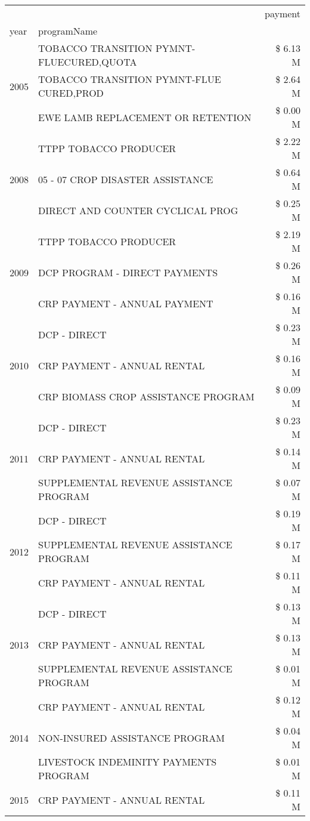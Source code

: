 \begin{tabular}{llr}
\toprule
 &  & payment \\
year & programName &  \\
\midrule
\multirow[t]{3}{*}{2005} & TOBACCO TRANSITION PYMNT-FLUECURED,QUOTA & \$ 6.13 M \\
 & TOBACCO TRANSITION PYMNT-FLUE CURED,PROD & \$ 2.64 M \\
 & EWE LAMB REPLACEMENT OR RETENTION & \$ 0.00 M \\
\cline{1-3}
\multirow[t]{3}{*}{2008} & TTPP TOBACCO PRODUCER & \$ 2.22 M \\
 & 05 - 07 CROP DISASTER ASSISTANCE & \$ 0.64 M \\
 & DIRECT AND COUNTER CYCLICAL PROG & \$ 0.25 M \\
\cline{1-3}
\multirow[t]{3}{*}{2009} & TTPP TOBACCO PRODUCER & \$ 2.19 M \\
 & DCP PROGRAM - DIRECT PAYMENTS & \$ 0.26 M \\
 & CRP PAYMENT - ANNUAL PAYMENT & \$ 0.16 M \\
\cline{1-3}
\multirow[t]{3}{*}{2010} & DCP - DIRECT & \$ 0.23 M \\
 & CRP PAYMENT - ANNUAL RENTAL & \$ 0.16 M \\
 & CRP BIOMASS CROP ASSISTANCE PROGRAM & \$ 0.09 M \\
\cline{1-3}
\multirow[t]{3}{*}{2011} & DCP - DIRECT & \$ 0.23 M \\
 & CRP PAYMENT - ANNUAL RENTAL & \$ 0.14 M \\
 & SUPPLEMENTAL REVENUE ASSISTANCE PROGRAM & \$ 0.07 M \\
\cline{1-3}
\multirow[t]{3}{*}{2012} & DCP - DIRECT & \$ 0.19 M \\
 & SUPPLEMENTAL REVENUE ASSISTANCE PROGRAM & \$ 0.17 M \\
 & CRP PAYMENT - ANNUAL RENTAL & \$ 0.11 M \\
\cline{1-3}
\multirow[t]{3}{*}{2013} & DCP - DIRECT & \$ 0.13 M \\
 & CRP PAYMENT - ANNUAL RENTAL & \$ 0.13 M \\
 & SUPPLEMENTAL REVENUE ASSISTANCE PROGRAM & \$ 0.01 M \\
\cline{1-3}
\multirow[t]{3}{*}{2014} & CRP PAYMENT - ANNUAL RENTAL & \$ 0.12 M \\
 & NON-INSURED ASSISTANCE PROGRAM & \$ 0.04 M \\
 & LIVESTOCK INDEMINITY PAYMENTS PROGRAM & \$ 0.01 M \\
\cline{1-3}
\multirow[t]{3}{*}{2015} & CRP PAYMENT - ANNUAL RENTAL & \$ 0.11 M \\

\end{tabular}
